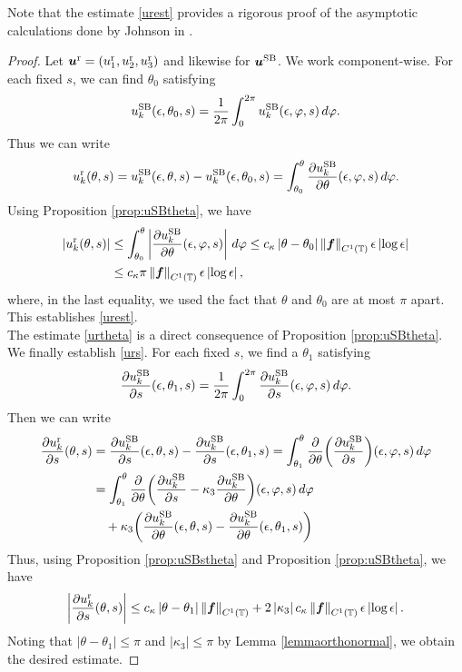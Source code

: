 \documentclass[11pt]{article}
\numberwithin{equation}{section}
\newcommand{\T}{\mathbb{T}}
\newcommand{\bu}{\bm{u}}
\newcommand{\p}{\partial}
\newcommand{\ts}{\thinspace}
\newcommand{\SB}{{\rm SB}}
\newcommand{\abs}[1]{\left\lvert #1 \right\rvert}
\newcommand{\norm}[1]{\left\lVert #1 \right\rVert}
\theoremstyle{definition}
\begin{document}
Note that the estimate \eqref{urest} provides a rigorous proof of the asymptotic calculations done by Johnson in \cite{johnson1980improved}. 

\begin{proof}
Let $\bu^{\rm r}=(u^{\rm r}_1,u^{\rm r}_2, u^{\rm r}_3)$ and likewise for $\bm{u}^{\rm SB}$. We work component-wise. For each fixed $s$, we can find $\theta_0$ satisfying
\[ u^{\SB}_k(\epsilon,\theta_0,s)=\frac{1}{2\pi}\int_0^{2\pi} u^{\SB}_k(\epsilon,\varphi,s) \ts d\varphi. \]
Thus we can write
\[ u^{\rm r}_k(\theta,s)=u^{\SB}_k(\epsilon,\theta,s) - u^{\SB}_k(\epsilon,\theta_0,s) = \int_{\theta_0}^\theta \frac{\p u^{\SB}_k}{\p \theta}(\epsilon,\varphi,s)\ts d\varphi. \]
Using Proposition \ref{prop:uSBtheta}, we have
\begin{equation}
\begin{split}
\abs{u^{\rm r}_k(\theta,s)}&\le \int_{\theta_0}^\theta \abs{\frac{\p u^{\SB}_k}{\p \theta}(\epsilon,\varphi,s)} \ts d\varphi 
\le c_\kappa\abs{\theta-\theta_0}\norm{\bm{f}}_{C^1(\T)}\epsilon \abs{\log\epsilon}\\
&\le c_\kappa\pi\norm{\bm{f}}_{C^1(\T)}\epsilon \abs{\log\epsilon},
\end{split}
\end{equation}
where, in the last equality, we used the fact that $\theta$ and $\theta_0$ are at most $\pi$ apart. This establishes \eqref{urest}. \\

The estimate \eqref{urtheta} is a direct consequence of Proposition \ref{prop:uSBtheta}. \\

We finally establish \eqref{urs}. For each fixed $s$, we find a $\theta_1$ satisfying
\[ \frac{\p u^{\SB}_k}{\p s}(\epsilon,\theta_1,s) = \frac{1}{2\pi}\int_{0}^{2\pi} \frac{\p u^{\SB}_k}{\p s}(\epsilon,\varphi,s)\ts d\varphi. \]
Then we can write
\begin{align*}
\frac{\p u^{\rm r}_k}{\p s}(\theta,s)&=\frac{\p u^{\SB}_k}{\p s}(\epsilon,\theta,s) - \frac{\p u^{\SB}_k}{\p s}(\epsilon,\theta_1,s)
=\int_{\theta_1}^{\theta} \frac{\p}{\p \theta}\bigg(\frac{\p u^{\SB}_k}{\p s}\bigg)(\epsilon,\varphi,s)\ts d\varphi\\
&=\int_{\theta_1}^{\theta} \frac{\p }{\p \theta}\bigg(\frac{\p u^{\SB}_k}{\p s}-\kappa_3\frac{\p u^{\SB}_k}{\p \theta} \bigg)(\epsilon,\varphi,s) \ts d\varphi\\
&\quad +\kappa_3\bigg(\frac{\p u^{\SB}_k}{\p \theta}(\epsilon,\theta,s) - \frac{\p u^{\SB}_k}{\p \theta}(\epsilon,\theta_1,s) \bigg)
\end{align*}
Thus, using Proposition \ref{prop:uSBstheta} and Proposition \ref{prop:uSBtheta}, we have
\begin{equation}
\abs{\frac{\p u^{\rm r}_k}{\p s}(\theta,s)} \le c_\kappa\abs{\theta-\theta_1}\norm{\bm{f}}_{C^1(\T)} + 2\abs{\kappa_3} c_\kappa\norm{\bm{f}}_{C^1(\T)}\epsilon\abs{\log\epsilon}.
\end{equation}
Noting that $\abs{\theta-\theta_1}\le \pi$ and $\abs{\kappa_3}\leq \pi$ by Lemma \ref{lemmaorthonormal}, we obtain the desired estimate.
\end{proof}
\end{document}
